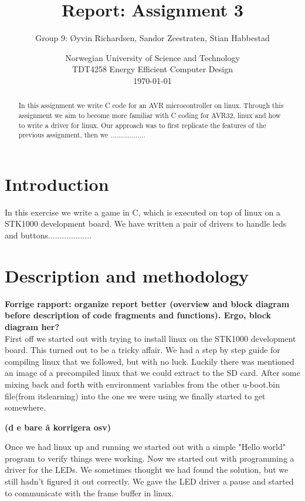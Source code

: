 \documentclass[a4paper,11pt]{article}
\title{\textbf{Report: Assignment 3}}
\author{Group 9: \O yvin Richardsen, Sandor Zeestraten, Stian Habbestad}
\date{{Norwegian University of Science and Technology \\
TDT4258 Energy Efficient Computer Design \\}
\today}
\begin{document}
\maketitle

\begin{abstract}
In this assignment we write C code for an AVR microcontroller on linux. Through this assignment we aim to become more familiar with C coding for AVR32, linux and how to write a driver for linux. Our approach was to first replicate the features of the previous assignment, then we ..................
\end{abstract}

\bigskip
\tableofcontents
\newpage

\section{Introduction}

In this exercise we write a game in C, which is executed on top of linux on a STK1000 development board. We have written a pair of drivers to handle leds and buttons...................

\section{Description and methodology}

\textbf{Forrige rapport: organize report better (overview and block diagram before description of code fragments and functions). Ergo, block diagram her?}\\

First off we started out with trying to install linux on the STK1000 development board. This turned out to be a tricky affair. We had a step by step guide for compiling linux that we followed, but with no luck. Luckily there was mentioned an image of a precompiled linux that we could extract to the SD card. After some mixing back and forth with environment variables from the other u-boot.bin file(from itslearning) into the one we were using we finally started to get somewhere. 

\textbf{(d e bare å korrigera osv) }

Once we had linux up and running we started out with a simple "Hello world" program to verify things were working. Now we started out with programming a driver for the LEDs. We sometimes thought we had found the solution, but we still hadn't figured it out correctly. We gave the LED driver a pause and started to communicate with the frame buffer in linux. 
\end{document}
